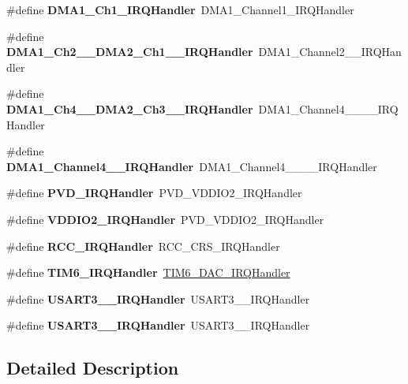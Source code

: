 \begin{DoxyCompactItemize}
\mbox{\label{group__stm32f071xb_ga3f7debe9fc2548ab6640825967110101}} 
\#define {\bfseries D\+M\+A1\+\_\+\+Ch1\+\_\+\+I\+R\+Q\+Handler}~D\+M\+A1\+\_\+\+Channel1\+\_\+\+I\+R\+Q\+Handler
\item 
\mbox{\label{group__stm32f071xb_ga3752ab0b9a6635ccd7bc87b99ee8fd9b}} 
\#define {\bfseries D\+M\+A1\+\_\+\+Ch2\+\_\+\_\+\+D\+M\+A2\+\_\+\+Ch1\+\_\+\_\+\+I\+R\+Q\+Handler}~D\+M\+A1\+\_\+\+Channel2\+\_\+\_\+\+I\+R\+Q\+Handler
\item 
\mbox{\label{group__stm32f071xb_ga035f9aa47c046222541cca70e281b415}} 
\#define {\bfseries D\+M\+A1\+\_\+\+Ch4\+\_\+\_\+\+D\+M\+A2\+\_\+\+Ch3\+\_\+\_\+\+I\+R\+Q\+Handler}~D\+M\+A1\+\_\+\+Channel4\+\_\+\_\+\_\+\_\+\+I\+R\+Q\+Handler
\item 
\mbox{\label{group__stm32f071xb_gac0e40c40e17f156c06448e594bf54eaf}} 
\#define {\bfseries D\+M\+A1\+\_\+\+Channel4\+\_\+\_\+\+I\+R\+Q\+Handler}~D\+M\+A1\+\_\+\+Channel4\+\_\+\_\+\_\+\_\+\+I\+R\+Q\+Handler
\item 
\mbox{\label{group__stm32f071xb_ga045476dfaec8c84f5e16b06b937c0c18}} 
\#define {\bfseries P\+V\+D\+\_\+\+I\+R\+Q\+Handler}~P\+V\+D\+\_\+\+V\+D\+D\+I\+O2\+\_\+\+I\+R\+Q\+Handler
\item 
\mbox{\label{group__stm32f071xb_gac1854dcfbcf2950cee25063d73a5edb0}} 
\#define {\bfseries V\+D\+D\+I\+O2\+\_\+\+I\+R\+Q\+Handler}~P\+V\+D\+\_\+\+V\+D\+D\+I\+O2\+\_\+\+I\+R\+Q\+Handler
\item 
\mbox{\label{group__stm32f071xb_ga5a6d083fa78461da86a717b28973e009}} 
\#define {\bfseries R\+C\+C\+\_\+\+I\+R\+Q\+Handler}~R\+C\+C\+\_\+\+C\+R\+S\+\_\+\+I\+R\+Q\+Handler
\item 
\mbox{\label{group__stm32f071xb_gae30e35a563a952a284f3f54d7f164ccd}} 
\#define {\bfseries T\+I\+M6\+\_\+\+I\+R\+Q\+Handler}~\hyperlink{group___h_a_l___time_base___t_i_m_ga0839a45f331c4c067939b9c4533bbf4d}{T\+I\+M6\+\_\+\+D\+A\+C\+\_\+\+I\+R\+Q\+Handler}
\item 
\mbox{\label{group__stm32f071xb_gaf04189172ff710986cd652a06e6f3f69}} 
\#define {\bfseries U\+S\+A\+R\+T3\+\_\+\_\+\+I\+R\+Q\+Handler}~U\+S\+A\+R\+T3\+\_\+\_\+\+I\+R\+Q\+Handler
\item 
\mbox{\label{group__stm32f071xb_ga36a6fa2533fdea503ca6341545d3148e}} 
\#define {\bfseries U\+S\+A\+R\+T3\+\_\+\_\+\+I\+R\+Q\+Handler}~U\+S\+A\+R\+T3\+\_\+\_\+\+I\+R\+Q\+Handler
\end{DoxyCompactItemize}


\subsection{Detailed Description}
